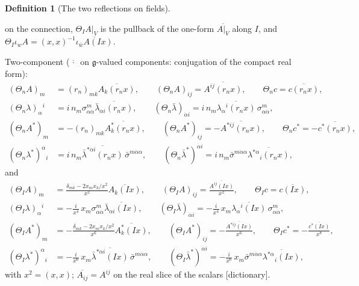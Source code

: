 \documentclass[11pt]{article}
\theoremstyle{definition}
\newtheorem{definition}{Definition}[section]
\begin{document}
\begin{definition}[The two reflections on fields]
\begin{itemize}
\[\]
on the connection, $\Theta_IA|_V$ is the pullback of the one-form $\overline{A|_V}$ along $I$, and $\Theta_I\iota_wA=(x,x)^{-1}\overline{\iota_{\bar w}A(Ix)}$.
\end{itemize}
Two-component ($\overline{\,\cdot\,}$ on $\mathfrak g$-valued components: conjugation of the compact real form):
\[
\begin{aligned}
(\Theta_nA)_m&=(r_n)_{mk}\overline{A_k(r_nx)},\qquad (\Theta_nA)_{ij}=\overline{A^{ij}(r_nx)},\qquad \Theta_nc=\overline{c(r_nx)},\\
(\Theta_n\lambda)_\alpha{}^i&=i\,n_m\sigma^m_{\alpha\dot\alpha}\overline{\bar\lambda_{\dot\alpha i}(r_nx)},\qquad (\Theta_n\bar\lambda)_{\dot\alpha i}=i\,n_m\overline{\lambda_\alpha{}^i(r_nx)}\,\sigma^m_{\alpha\dot\alpha},\\
(\Theta_nA^*)_m&=-(r_n)_{mk}\overline{A^*_k(r_nx)},\qquad (\Theta_nA^*)_{ij}=-\overline{A^{*ij}(r_nx)},\qquad \Theta_nc^*=-\overline{c^*(r_nx)},\\
(\Theta_n\lambda^*)^\alpha{}_i&=i\,n_m\overline{\bar\lambda^{*\dot\alpha i}(r_nx)}\,\bar\sigma^{m\dot\alpha\alpha},\qquad (\Theta_n\bar\lambda^*)^{\dot\alpha i}=i\,n_m\bar\sigma^{m\dot\alpha\alpha}\overline{\lambda^{*\alpha}{}_i(r_nx)},
\end{aligned}
\]
and
\[
\begin{aligned}
(\Theta_IA)_m&=\frac{\delta_{mk}-2x_mx_k/x^2}{x^2}\overline{A_k(Ix)},\qquad (\Theta_IA)_{ij}=\frac{\overline{A^{ij}(Ix)}}{x^2},\qquad \Theta_Ic=\overline{c(Ix)},\\
(\Theta_I\lambda)_\alpha{}^i&=-\frac{i}{x^4}\,x_m\sigma^m_{\alpha\dot\alpha}\overline{\bar\lambda_{\dot\alpha i}(Ix)},\qquad (\Theta_I\bar\lambda)_{\dot\alpha i}=-\frac{i}{x^4}\,x_m\overline{\lambda_\alpha{}^i(Ix)}\,\sigma^m_{\alpha\dot\alpha},\\
(\Theta_IA^*)_m&=-\frac{\delta_{mk}-2x_mx_k/x^2}{x^6}\overline{A^*_k(Ix)},\qquad (\Theta_IA^*)_{ij}=-\frac{\overline{A^{*ij}(Ix)}}{x^6},\qquad \Theta_Ic^*=-\frac{\overline{c^*(Ix)}}{x^8},\\
(\Theta_I\lambda^*)^\alpha{}_i&=-\frac{i}{x^6}\,x_m\overline{\bar\lambda^{*\dot\alpha i}(Ix)}\,\bar\sigma^{m\dot\alpha\alpha},\qquad (\Theta_I\bar\lambda^*)^{\dot\alpha i}=-\frac{i}{x^6}\,x_m\bar\sigma^{m\dot\alpha\alpha}\overline{\lambda^{*\alpha}{}_i(Ix)},
\end{aligned}
\]
with $x^2=(x,x)$; $\overline{A_{ij}}=A^{ij}$ on the real slice of the scalars [dictionary].
\end{definition}
\end{document}
